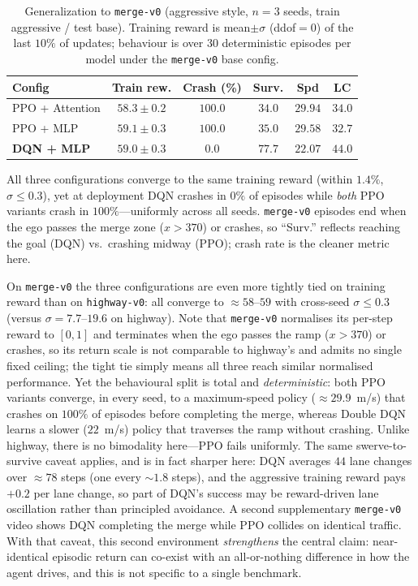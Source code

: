 \documentclass[conference]{IEEEtran}
\newcommand{\code}[1]{\texttt{#1}}
\begin{document}
\begin{table}[t]
\caption{Generalization to \code{merge-v0} (aggressive style, $n=3$ seeds, train aggressive / test base). Training reward is mean$\pm\sigma$ (ddof$=0$) of the last $10\%$ of updates; behaviour is over 30 deterministic episodes per model under the \code{merge-v0} base config.}
\label{tab:merge}
\centering
\small
\begin{tabular}{@{}lccccc@{}}
\toprule
Config & Train rew. & Crash (\%) & Surv. & Spd & LC \\
\midrule
PPO + Attention & $58.3{\pm}0.2$ & $100.0$ & $34.0$ & $29.94$ & $34.0$ \\
PPO + MLP       & $59.1{\pm}0.3$ & $100.0$ & $35.0$ & $29.58$ & $32.7$ \\
\textbf{DQN + MLP} & $59.0{\pm}0.3$ & $\mathbf{0.0}$ & $77.7$ & $22.07$ & $44.0$ \\
\bottomrule
\end{tabular}
\vspace{2pt}
\parbox{\columnwidth}{\footnotesize All three configurations converge to the same
training reward (within $1.4\%$, $\sigma\leq0.3$), yet at deployment DQN crashes
in $0\%$ of episodes while \emph{both} PPO variants crash in $100\%$---uniformly
across all seeds. \code{merge-v0} episodes end when the ego passes the merge zone
($x>370$) or crashes, so ``Surv.'' reflects reaching the goal (DQN) vs.\ crashing
midway (PPO); crash rate is the cleaner metric here.}
\end{table}

On \code{merge-v0} the three configurations are even more tightly tied on
training reward than on \code{highway-v0}: all converge to ${\approx}58$--$59$
with cross-seed $\sigma\leq0.3$ (versus $\sigma=7.7$--$19.6$ on highway). Note
that \code{merge-v0} normalises its per-step reward to $[0,1]$ and terminates
when the ego passes the ramp ($x>370$) or crashes, so its return scale is not
comparable to highway's and admits no single fixed ceiling; the tight tie simply
means all three reach similar normalised performance. Yet the behavioural split
is total and \emph{deterministic}: both PPO variants converge, in every seed, to
a maximum-speed policy (${\approx}29.9$~m/s) that crashes on $100\%$ of episodes
before completing the merge, whereas Double DQN learns a slower ($22$~m/s) policy
that traverses the ramp without crashing. Unlike highway, there is no bimodality
here---PPO fails uniformly. The same swerve-to-survive caveat applies, and is in
fact sharper here: DQN averages $44$ lane changes over ${\approx}78$ steps (one
every ${\sim}1.8$ steps), and the aggressive training reward pays $+0.2$ per lane
change, so part of DQN's success may be reward-driven lane oscillation rather
than principled avoidance. A second supplementary \code{merge-v0} video shows DQN
completing the merge while PPO collides on identical traffic. With
that caveat, this second environment \emph{strengthens} the central claim:
near-identical episodic return can co-exist with an all-or-nothing difference in
how the agent drives, and this is not specific to a single benchmark.
\end{document}
